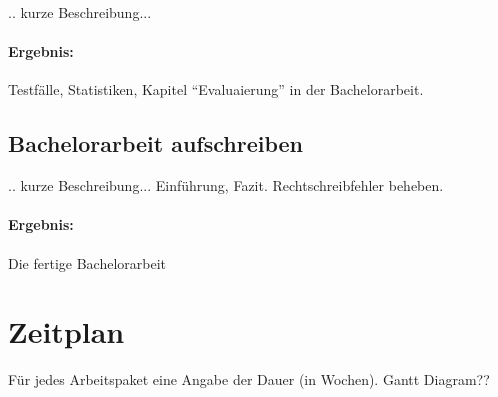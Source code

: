 \documentclass[a4paper]{article}
\begin{document}
.. kurze Beschreibung...

\paragraph{Ergebnis:}
Testfälle, Statistiken,
Kapitel "`Evaluaierung"' in der Bachelorarbeit.

\subsection{Bachelorarbeit aufschreiben}

.. kurze Beschreibung...
Einführung, Fazit. Rechtschreibfehler beheben.

\paragraph{Ergebnis:}
Die fertige Bachelorarbeit


\section{Zeitplan}

Für jedes Arbeitspaket eine Angabe der Dauer (in Wochen).
Gantt Diagram??




\end{document}
